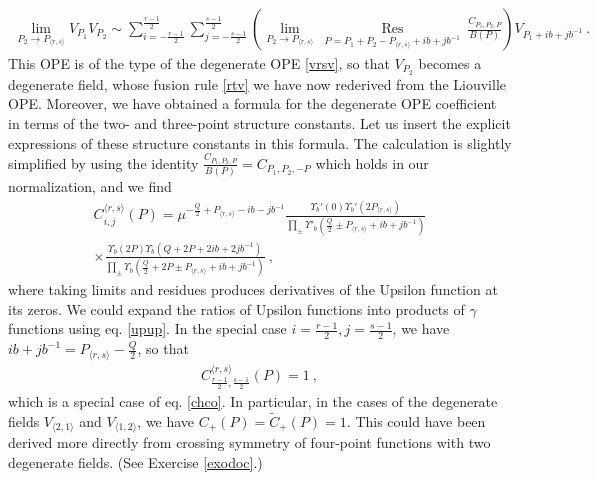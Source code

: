 \documentclass[12pt, a4paper, notitlepage, twoside]{report}
\numberwithin{equation}{section}
\theoremstyle{break}
\begin{document}
\begin{align}
\underset{P_2\to P_{\langle r,s \rangle}}{\lim} V_{P_1}V_{P_2} \sim \sum_{i=-\frac{r-1}{2}}^{\frac{r-1}{2}} \sum_{j=-\frac{s-1}{2}}^{\frac{s-1}{2}}
 \left(\underset{P_2\to P_{\langle r,s \rangle}}{\lim}\ \underset{P=P_1+P_2-P_{\langle r,s \rangle}+ib+jb^{-1}}{\operatorname{ Res}}\ \frac{C_{P_1,P_2,P}}{B(P)}\right) V_{P_1 + ib+jb^{-1}}\ .
\label{crs}
\end{align}
This OPE is of the type of the degenerate OPE \eqref{vrsv}, so that $V_{P_2}$ becomes a degenerate field, whose fusion rule \eqref{rtv} we have now rederived from the Liouville OPE.
Moreover, we have obtained a formula for the degenerate OPE coefficient in terms of the two- and three-point structure constants. Let us insert the explicit expressions of these structure constants in this formula. The calculation is slightly simplified by using the identity $\frac{C_{P_1,P_2,P}}{B(P)} = C_{P_1,P_2,-P}$ which holds in our normalization, and we find
\begin{multline}
 C_{i,j}^{\langle r,s \rangle}(P) = \mu^{-\frac{Q}{2}+P_{\langle r,s\rangle}-ib-jb^{-1}} 
 \frac{\Upsilon_b'(0)\Upsilon_b'(2P_{\langle r,s \rangle})}{\prod_{\pm}\Upsilon'_b(\frac{Q}{2}\pm P_{\langle r,s\rangle} +ib+jb^{-1})} 
 \\ \times 
 \frac{\Upsilon_b(2P)\Upsilon_b(Q+2P+2ib+2jb^{-1})}{\prod_\pm \Upsilon_b(\frac{Q}{2}+2P\pm P_{\langle r,s\rangle} +ib+jb^{-1})}
 \label{cijrs}
 \ ,
\end{multline}
where taking limits and residues produces derivatives of the Upsilon function at its zeros.
We could expand the ratios of Upsilon functions into products of $\gamma$ functions using eq. \eqref{upup}.
In the special case $i=\frac{r-1}{2}, j=\frac{s-1}{2}$, we have $ib+jb^{-1} = P_{\langle r,s\rangle}-\frac{Q}{2} $, so that 
\begin{align}
 C_{\frac{r-1}{2},\frac{s-1}{2}}^{\langle r,s \rangle}(P) = 1 \ ,
 \label{cco}
\end{align}
which is a special case of eq. \eqref{chco}.
In particular, in the cases of the degenerate fields $V_{\langle 2,1\rangle}$ and $V_{\langle 1,2\rangle}$, we have $C_+(P)=\tilde{C}_+(P)=1$. This could have been derived more directly from crossing symmetry of four-point functions with two degenerate fields. 
(See Exercise \ref{exodoc}.) 
\end{document}
